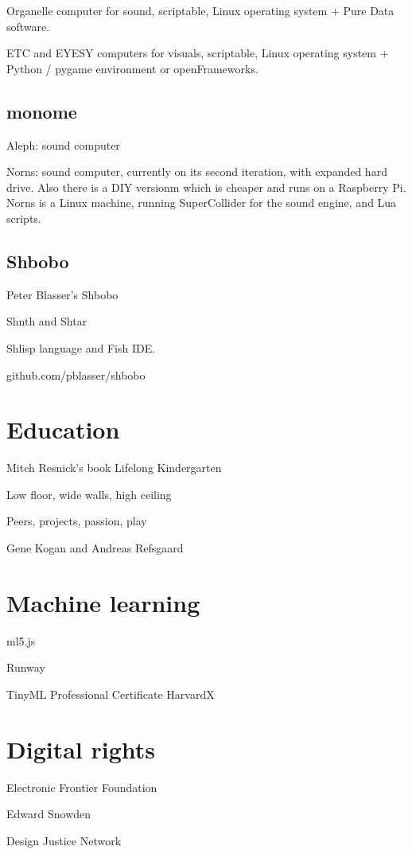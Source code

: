 Organelle computer for sound, scriptable, Linux operating system + Pure Data software.

ETC and EYESY computers for visuals, scriptable, Linux operating system + Python / pygame environment or openFrameworks.

\subsection{monome}

Aleph: sound computer

Norns: sound computer, currently on its second iteration, with expanded hard drive. Also there is a DIY versionm which is cheaper and runs on a Raspberry Pi.
Norns is a Linux machine, running SuperCollider for the sound engine, and Lua scripts.

\subsection{Shbobo}

Peter Blasser's Shbobo

Shnth and Shtar

Shlisp language and Fish IDE.

github.com/pblasser/shbobo

\section{Education}

Mitch Resnick's book Lifelong Kindergarten

Low floor, wide walls, high ceiling

Peers, projects, passion, play

Gene Kogan and Andreas Refsgaard

\section{Machine learning}

ml5.js

Runway

TinyML Professional Certificate HarvardX

\section{Digital rights}

Electronic Frontier Foundation

Edward Snowden

Design Justice Network
